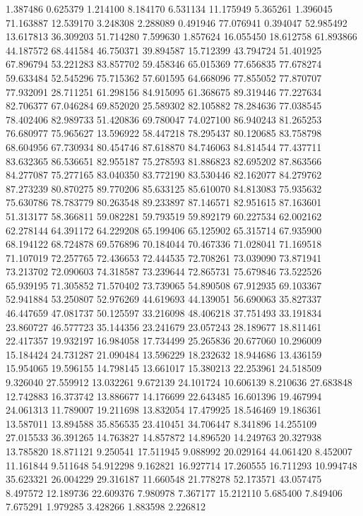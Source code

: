 1.387486
0.625379
1.214100
8.184170
6.531134
11.175949
5.365261
1.396045
71.163887
12.539170
3.248308
2.288089
0.491946
77.076941
0.394047
52.985492
13.617813
36.309203
51.714280
7.599630
1.857624
16.055450
18.612758
61.893866
44.187572
68.441584
46.750371
39.894587
15.712399
43.794724
51.401925
67.896794
53.221283
83.857702
59.458346
65.015369
77.656835
77.678274
59.633484
52.545296
75.715362
57.601595
64.668096
77.855052
77.870707
77.932091
28.711251
61.298156
84.915095
61.368675
89.319446
77.227634
82.706377
67.046284
69.852020
25.589302
82.105882
78.284636
77.038545
78.402406
82.989733
51.420836
69.780047
74.027100
86.940243
81.265253
76.680977
75.965627
13.596922
58.447218
78.295437
80.120685
83.758798
68.604956
67.730934
80.454746
87.618870
84.746063
84.814544
77.437711
83.632365
86.536651
82.955187
75.278593
81.886823
82.695202
87.863566
84.277087
75.277165
83.040350
83.772190
83.530446
82.162077
84.279762
87.273239
80.870275
89.770206
85.633125
85.610070
84.813083
75.935632
75.630786
78.783779
80.263548
89.233897
87.146571
82.951615
87.163601
51.313177
58.366811
59.082281
59.793519
59.892179
60.227534
62.002162
62.278144
64.391172
64.229208
65.199406
65.125902
65.315714
67.935900
68.194122
68.724878
69.576896
70.184044
70.467336
71.028041
71.169518
71.107019
72.257765
72.436653
72.444535
72.708261
73.039090
73.871941
73.213702
72.090603
74.318587
73.239644
72.865731
75.679846
73.522526
65.939195
71.305852
71.570402
73.739065
54.890508
67.912935
69.103367
52.941884
53.250807
52.976269
44.619693
44.139051
56.690063
35.827337
46.447659
47.081737
50.125597
33.216098
48.406218
37.751493
33.191834
23.860727
46.577723
35.144356
23.241679
23.057243
28.189677
18.811461
22.417357
19.932197
16.984058
17.734499
25.265836
20.677060
10.296009
15.184424
24.731287
21.090484
13.596229
18.232632
18.944686
13.436159
15.954065
19.596155
14.798145
13.661017
15.380213
22.253961
24.518509
9.326040
27.559912
13.032261
9.672139
24.101724
10.606139
8.210636
27.683848
12.742883
16.373742
13.886677
14.176699
22.643485
16.601396
19.467994
24.061313
11.789007
19.211698
13.832054
17.479925
18.546469
19.186361
13.587011
13.894588
35.856535
23.410451
34.706447
8.341896
14.255109
27.015533
36.391265
14.763827
14.857872
14.896520
14.249763
20.327938
13.785820
18.871121
9.250541
17.511945
9.088992
20.029164
44.061420
8.452007
11.161844
9.511648
54.912298
9.162821
16.927714
17.260555
16.711293
10.994748
35.623321
26.004229
29.316187
11.660548
21.778278
52.173571
43.057475
8.497572
12.189736
22.609376
7.980978
7.367177
15.212110
5.685400
7.849406
7.675291
1.979285
3.428266
1.883598
2.226812
